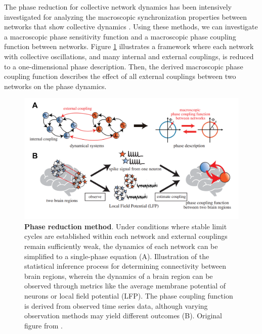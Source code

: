 \documentclass[../main.tex]{subfiles}
\begin{document}
The phase reduction for collective network dynamics has been intensively investigated for analyzing the macroscopic synchronization properties between networks that show collective dynamics \citep{pikovsky2015dynamics}.
Using these methods, we can investigate a macroscopic phase sensitivity function and a macroscopic phase coupling function between networks.
Figure \ref{fig:phase_reduction_schematics} illustrates a framework where each network with collective oscillations, and many internal and external couplings, is reduced to a one-dimensional phase description.
Then, the derived macroscopic phase coupling function describes the effect of all external couplings between two networks on the phase
dynamics.
\begin{figure}[!htb]
    \centering
    \includegraphics[width=\textwidth]{chapter2/figures/schematics_.png}
    \caption{\textbf{Phase reduction method}.
    Under conditions where stable limit cycles are established within each network and external couplings remain sufficiently weak, the dynamics of each network can be simplified to a single-phase equation (A).
    Illustration of the statistical inference process for determining connectivity between brain regions, wherein the dynamics of a brain region can be observed through metrics like the average membrane potential of neurons or local field potential (LFP).
    The phase coupling function is derived from observed time series data, although varying observation methods may yield different outcomes (B).
    Original figure from \citep{arai_extracting_2022}.}
    \label{fig:phase_reduction_schematics}
\end{figure}
\end{document}
